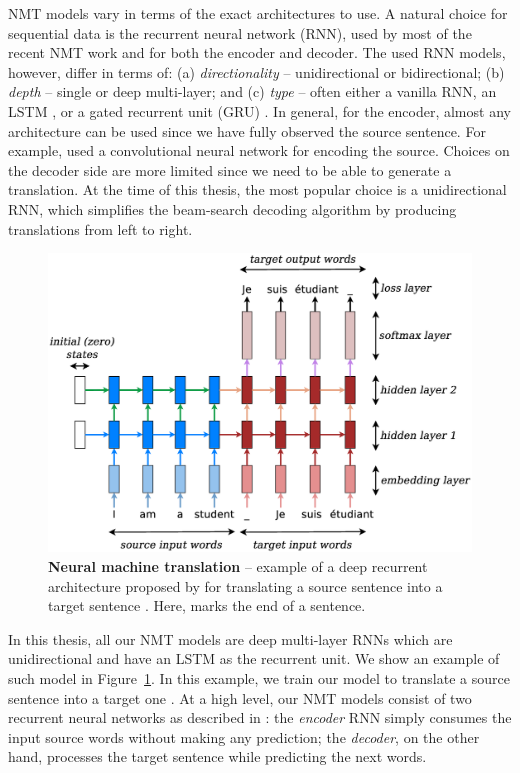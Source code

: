 NMT models vary in terms of the exact architectures to use.
A natural choice for sequential data is the recurrent
neural network (RNN), used by most of the recent NMT work and for both the
encoder and decoder.
The used RNN models, however, differ in terms of: (a) {\it directionality} -- unidirectional
or bidirectional; (b) {\it depth} -- single or deep multi-layer; and (c) {\it
type} -- often either a vanilla RNN, an LSTM 
\cite{lstm97}, or a gated recurrent unit (GRU) \cite{cho14}.
In general, for the encoder, almost any architecture can be used since we have
fully observed the source sentence. 
For example,  used a convolutional neural network for encoding the source.
Choices on the decoder side are more limited since we need to be able
to generate a translation. At the time of this thesis, the most popular choice is a
unidirectional RNN, which simplifies the beam-search decoding algorithm by
producing translations from left to right.

\begin{figure}[tbh!]
\centering
\includegraphics[width=1\textwidth, clip=true, trim= 0 0 0
0]{img/nmt_very_details.eps} %
\caption[Neural machine translation]{{\bf Neural machine translation} -- example of a deep recurrent
architecture proposed by  for
translating a source sentence  into a target sentence
. Here, \word{\texttt{\_}} marks the end of a sentence.
} 
\label{f:nmt_details}
\end{figure}

In this thesis, all our NMT models are deep multi-layer RNNs which are 
unidirectional and have an LSTM as the recurrent unit. We show an example of
such model in Figure~\ref{f:nmt_details}.
In this example, we train our model to translate a source sentence
 into a target one .
At a high level, our NMT models consist of two recurrent neural networks as
described in : the {\it encoder} RNN simply consumes the input
source words without making any prediction; the {\it decoder}, on the other
hand, processes
the target sentence while predicting the next words. 

